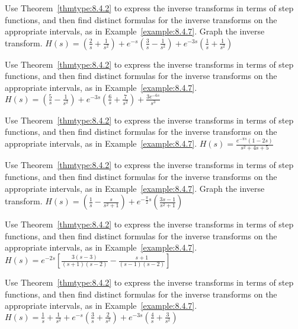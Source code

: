 \documentclass{ximera}
\begin{document}
\begin{problem}\label{exer:8.4.22} Use Theorem~\ref{thmtype:8.4.2} to express the inverse transforms in terms of step functions, and then find distinct formulas for the inverse transforms on the appropriate intervals, as in
Example~\ref{example:8.4.7}.  Graph the inverse transform.  $H(s)=\left(\frac{2}{s}+\frac{1}{s^2}\right)
+e^{-s}\left(\frac{3}{s}-\frac{1}{s^2}\right)+e^{-3s}\left(\frac{1}{s}+\frac{1}{s^2}\right)$
\end{problem}

\begin{problem}\label{exer:8.4.23} Use Theorem~\ref{thmtype:8.4.2} to express the inverse transforms in terms of step functions, and then find distinct formulas for the inverse transforms on the appropriate intervals, as in
Example~\ref{example:8.4.7}.
$H(s)=\left(\frac{5}{s}-\frac{1}{s^2}\right)
+e^{-3s}\left(\frac{6}{s}+\frac{7}{s^2}\right)+\frac{3e^{-6s}}{s^3}$
\end{problem}

\begin{problem}\label{exer:8.4.24}
Use Theorem~\ref{thmtype:8.4.2} to express the inverse transforms in terms of step functions, and then find distinct formulas for the inverse transforms on the appropriate intervals, as in
Example~\ref{example:8.4.7}.
$H(s)=\frac{e^{-\pi s} (1-2s)}{s^2+4s+5}$
\end{problem}

\begin{problem}\label{exer:8.4.25} Use Theorem~\ref{thmtype:8.4.2} to express the inverse transforms in terms of step functions, and then find distinct formulas for the inverse transforms on the appropriate intervals, as in
Example~\ref{example:8.4.7}.  Graph the inverse transform.
$H(s)=\left(\frac{1}{s}-\frac{s}{s^2+1}\right)+e^{-\frac{\pi}{2}s}\left(\frac{3s-1}{s^2+1}\right)$
\end{problem}

\begin{problem}\label{exer:8.4.26} Use Theorem~\ref{thmtype:8.4.2} to express the inverse transforms in terms of step functions, and then find distinct formulas for the inverse transforms on the appropriate intervals, as in
Example~\ref{example:8.4.7}.  $H(s)= e^{-2s}\left[\frac{3(s-3)}{(s+1)(s-2)}-\frac{s+1}{(s-1)(s-2)}\right]$
\end{problem}

\begin{problem}\label{exer:8.4.27} Use Theorem~\ref{thmtype:8.4.2} to express the inverse transforms in terms of step functions, and then find distinct formulas for the inverse transforms on the appropriate intervals, as in
Example~\ref{example:8.4.7}.
$H(s)=\frac{1}{s}+\frac{1}{s^2}+e^{-s}\left(\frac{3}{s}+\frac{2}{s^2}\right) +e^{-3s}\left(\frac{4}{s}+\frac{3}{s^2}\right)$
\end{problem}
\end{document}
